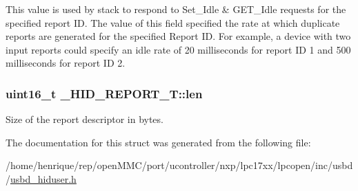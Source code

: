 This value is used by stack to respond to Set\-\_\-\-Idle \& G\-E\-T\-\_\-\-Idle requests for the specified report I\-D. The value of this field specified the rate at which duplicate reports are generated for the specified Report I\-D. For example, a device with two input reports could specify an idle rate of 20 milliseconds for report I\-D 1 and 500 milliseconds for report I\-D 2. \hypertarget{struct__HID__REPORT__T_a4c0e68b7360c08788605db4eb667cb4e}{
\subsubsection[{len}]{\setlength{\rightskip}{0pt plus 5cm}uint16\-\_\-t \-\_\-\-H\-I\-D\-\_\-\-R\-E\-P\-O\-R\-T\-\_\-\-T\-::len}}\label{struct__HID__REPORT__T_a4c0e68b7360c08788605db4eb667cb4e}
Size of the report descriptor in bytes. 

The documentation for this struct was generated from the following file\-:\begin{DoxyCompactItemize}
\item 
/home/henrique/rep/open\-M\-M\-C/port/ucontroller/nxp/lpc17xx/lpcopen/inc/usbd/\hyperlink{usbd__hiduser_8h}{usbd\-\_\-hiduser.\-h}\end{DoxyCompactItemize}
